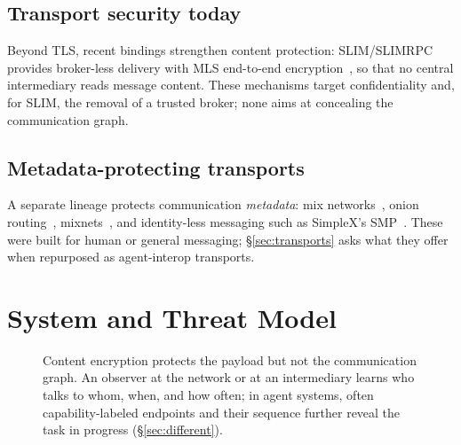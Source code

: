 \documentclass[10pt,twocolumn]{article}
\theoremstyle{definition}
\begin{document}
\subsection{Transport security today}
Beyond TLS, recent bindings strengthen content protection: SLIM/SLIMRPC provides
broker-less delivery with MLS end-to-end encryption~\citep{slim, mls}, so that no
central intermediary reads message content. These mechanisms target confidentiality
and, for SLIM, the removal of a trusted broker; none aims at concealing the
communication graph.

\subsection{Metadata-protecting transports}
A separate lineage protects communication \emph{metadata}: mix
networks~\citep{chaum1981mix}, onion routing~\citep{tor}, mixnets~\citep{nym}, and
identity-less messaging such as SimpleX's SMP~\citep{simplex}. These were built for
human or general messaging; \S\ref{sec:transports} asks what they offer when
repurposed as agent-interop transports.

\section{System and Threat Model}\label{sec:threat}

\begin{figure}[t]
\centering
{}
\caption{Content encryption protects the payload but not the communication graph.
An observer at the network or at an intermediary learns who talks to whom, when, and
how often; in agent systems, often capability-labeled endpoints and their sequence
further reveal the task in progress (\S\ref{sec:different}).}
\label{fig:graph}
\end{figure}
\end{document}
